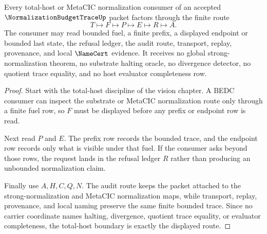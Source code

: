\begin{theorem}
\label{thm:normalization-budget-trace-total-host-boundary}
Every total-host or MetaCIC normalization consumer of an accepted $\NormalizationBudgetTraceUp$ packet factors through the finite route
$$
T \longmapsto F \longmapsto P \longmapsto E \longmapsto R \longmapsto A .
$$
The consumer may read bounded fuel, a finite prefix, a displayed endpoint or bounded last state, the refusal ledger, the audit route, transport, replay, provenance, and local $\NameCert$ evidence. It receives no global strong-normalization theorem, no substrate halting oracle, no divergence detector, no quotient trace equality, and no host evaluator completeness row.
\end{theorem}
\begin{proof}
Start with the total-host discipline of the vision chapter. A BEDC consumer can inspect the substrate or MetaCIC normalization route only through a finite fuel row, so $F$ must be displayed before any prefix or endpoint row is read.

Next read $P$ and $E$. The prefix row records the bounded trace, and the endpoint row records only what is visible under that fuel. If the consumer asks beyond those rows, the request lands in the refusal ledger $R$ rather than producing an unbounded normalization claim.

Finally use $A,H,C,Q,N$. The audit route keeps the packet attached to the strong-normalization and MetaCIC normalization maps, while transport, replay, provenance, and local naming preserve the same finite bounded trace. Since no carrier coordinate names halting, divergence, quotient trace equality, or evaluator completeness, the total-host boundary is exactly the displayed route.
\end{proof}



